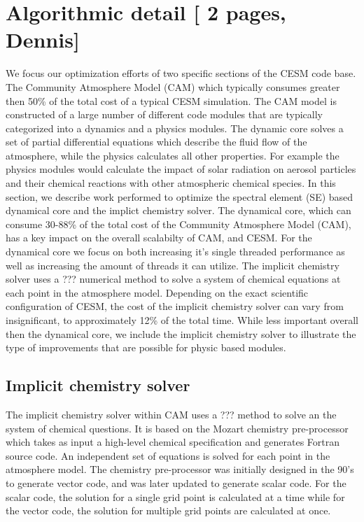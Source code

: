 \section{Algorithmic detail [{\color{red} 2 pages, Dennis}]}\label{sec:algorithm}

  We focus our optimization efforts of two specific sections of the CESM code base. The 
 Community Atmosphere Model (CAM) which typically consumes greater then 50\% of the total cost of a typical 
 CESM simulation.  The CAM model is constructed of a large number of different code modules that are typically 
 categorized into a dynamics and a physics modules.  The dynamic core solves a set of partial differential equations
 which describe the fluid flow of the atmosphere, while the physics calculates all other properties.  For example the physics 
 modules would calculate the impact of solar radiation on aerosol particles and their chemical reactions with other 
 atmospheric chemical species.  In this section, we describe work performed to optimize the  spectral element (SE) based
  dynamical core and the implict chemistry solver.  The dynamical core, which can consume 30-88\% of the total cost of the Community Atmosphere Model (CAM), has  a key impact on the overall scalabilty of CAM, and CESM.  For the dynamical core we focus on 
both increasing it's single threaded performance as well as increasing the amount of threads it can utilize.  
The implicit chemistry solver  uses a ??? numerical method to solve a system of chemical equations at each point 
in the atmosphere model.  Depending on the exact scientific configuration of CESM, the cost of the implicit chemistry solver can 
vary from insignificant, to approximately 12\% of the total time.  While less important overall then the dynamical core, we include the 
implicit chemistry solver to illustrate the type of improvements that are possible for physic based modules.  



\subsection{Implicit chemistry solver}\label{sec:chem-algor}

    The implicit chemistry solver within CAM uses a ??? method to solve an the system of chemical questions.  It is based on the Mozart \cite{mozart} chemistry pre-processor which takes as input a high-level chemical specification and generates Fortran source code.  An independent set of equations is solved for each point in the atmosphere model.  The chemistry pre-processor was initially designed in the 90's to generate vector code, and was later updated to generate scalar code.  For the scalar code, the solution for a single grid point is calculated at a time while for the vector code, the solution for multiple grid points are calculated at once. 

